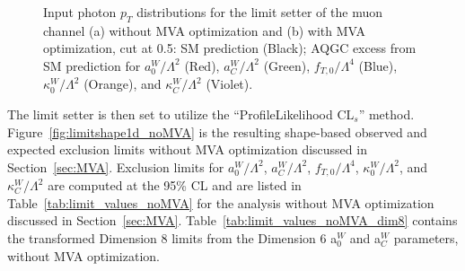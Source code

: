 \begin{figure}[b]
  \begin{center}
    \caption{ Input photon $p_{T}$ distributions for the limit setter of the muon channel (a) without MVA optimization and (b) with MVA optimization, cut at 0.5: SM prediction (Black); AQGC excess from SM prediction for $a_{0}^{W}/\Lambda^{2}$ (Red), $a_{C}^{W}/\Lambda^{2}$ (Green), $f_{T,0}/\Lambda^{4}$ (Blue), $\kappa_{0}^{W}/\Lambda^{2}$ (Orange), and $\kappa_{C}^{W}/\Lambda^{2}$ (Violet). }
    \label{fig:limitinput}
  \end{center}
\end{figure}

The limit setter is then set to utilize the ``ProfileLikelihood CL$_{s}$''
\cite{cite:asympcls1,cite:asympcls2} method. Figure~\ref{fig:limitshape1d_noMVA} 
is the resulting shape-based observed 
and expected exclusion limits without MVA optimization discussed in 
Section~\ref{sec:MVA}.  Exclusion limits for $a_{0}^{W}/\Lambda^{2}$, 
$a_{C}^{W}/\Lambda^{2}$, $f_{T,0}/\Lambda^{4}$, $\kappa_{0}^{W}/\Lambda^{2}$, and 
$\kappa_{C}^{W}/\Lambda^{2}$ are computed at the 95\% CL and are listed in
Table~\ref{tab:limit_values_noMVA} for the analysis without MVA optimization
discussed in Section~\ref{sec:MVA}. Table~\ref{tab:limit_values_noMVA_dim8}
contains the transformed Dimension 8 limits from the Dimension 6 a$_{0}^{W}$
and a$_{C}^{W}$ parameters, without MVA optimization. 

